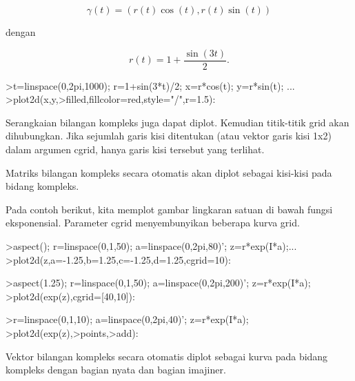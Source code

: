 \documentclass{article}
\begin{document}
\begin{eulernotebook}
\begin{eulercomment}
\begin{eulercomment}
\begin{eulercomment}
\begin{eulercomment}
\begin{eulercomment}
\begin{eulercomment}
\begin{eulercomment}
\begin{eulercomment}
\begin{eulercomment}
\end{eulercomment}
\begin{eulerformula}
\[
\gamma(t) = (r(t) \cos(t), r(t) \sin(t))
\]
\end{eulerformula}
\begin{eulercomment}
dengan

\end{eulercomment}
\begin{eulerformula}
\[
r(t) = 1 + \dfrac{\sin(3t)}{2}.
\]
\end{eulerformula}
\begin{eulerprompt}
>t=linspace(0,2pi,1000); r=1+sin(3*t)/2; x=r*cos(t); y=r*sin(t); ...
>plot2d(x,y,>filled,fillcolor=red,style="/",r=1.5):
\end{eulerprompt}
\begin{eulercomment}
Serangkaian bilangan kompleks juga dapat diplot. Kemudian titik-titik
grid akan dihubungkan. Jika sejumlah garis kisi ditentukan (atau
vektor garis kisi 1x2) dalam argumen cgrid, hanya garis kisi tersebut
yang terlihat.

Matriks bilangan kompleks secara otomatis akan diplot sebagai
kisi-kisi pada bidang kompleks.

Pada contoh berikut, kita memplot gambar lingkaran satuan di bawah
fungsi eksponensial. Parameter cgrid menyembunyikan beberapa kurva
grid.
\end{eulercomment}
\begin{eulerprompt}
>aspect(); r=linspace(0,1,50); a=linspace(0,2pi,80)'; z=r*exp(I*a);...
>plot2d(z,a=-1.25,b=1.25,c=-1.25,d=1.25,cgrid=10):
\end{eulerprompt}
\begin{eulerprompt}
>aspect(1.25); r=linspace(0,1,50); a=linspace(0,2pi,200)'; z=r*exp(I*a);
>plot2d(exp(z),cgrid=[40,10]):
\end{eulerprompt}
\begin{eulerprompt}
>r=linspace(0,1,10); a=linspace(0,2pi,40)'; z=r*exp(I*a);
>plot2d(exp(z),>points,>add):
\end{eulerprompt}
\begin{eulercomment}
Vektor bilangan kompleks secara otomatis diplot sebagai kurva pada
bidang kompleks dengan bagian nyata dan bagian imajiner.


\end{eulercomment}
\end{eulercomment}
\end{eulercomment}
\end{eulercomment}
\end{eulercomment}
\end{eulercomment}
\end{eulercomment}
\end{eulercomment}
\end{eulercomment}
\end{eulernotebook}
\end{document}
